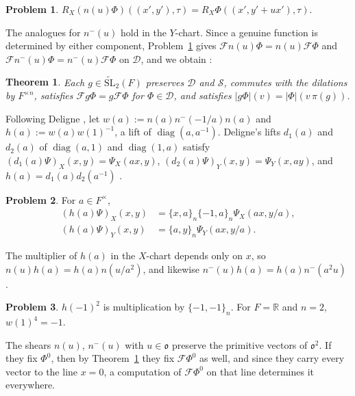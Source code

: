 \documentclass[reqno]{amsart}
\newcommand{\tSL}{\widetilde{\mathrm{SL}}_2}
\newcommand{\Fc}{\mathcal{F}}
\newcommand{\Dc}{\mathcal{D}}
\newcommand{\Sc}{\mathcal{S}}
\newcommand{\oo}{\mathfrak{o}}
\numberwithin{equation}{section}
\theoremstyle{definition}
\newtheorem{problem}{Problem}[section]
\theoremstyle{plain}
\newtheorem{theorem}{Theorem}[section]
\begin{document}
\begin{problem}\label{pr:unip-lines}
  $R_X(n(u) \Phi)((x', y'), \tau) = R_X \Phi((x', y' + u x'), \tau)$.
\end{problem}

The analogues for $n^-(u)$ hold in the $Y$-chart.  Since a genuine function is determined by either component, Problem~\ref{pr:unip-lines} gives $\Fc n(u) \Phi = n(u) \Fc \Phi$ and $\Fc n^-(u) \Phi = n^-(u) \Fc \Phi$ on $\Dc$, and we obtain \cite[Corollary~5.3]{N}:

\begin{theorem}\label{th:metaplectic}
  Each $g \in \tSL(F)$ preserves $\Dc$ and $\Sc$, commutes with the dilations by $F^{\times n}$, satisfies $\Fc g \Phi = g \Fc \Phi$ for $\Phi \in \Dc$, and satisfies $\lvert g \Phi \rvert(v) = \lvert \Phi \rvert(v \, \pi(g))$.
\end{theorem}

Following Deligne \cite[\S1.9]{Del}, let $w(a) := n(a) n^-(-1/a) n(a)$ and $h(a) := w(a) w(1)^{-1}$, a lift of $\operatorname{diag}(a, a^{-1})$.  Deligne's lifts $d_1(a)$ and $d_2(a)$ of $\operatorname{diag}(a, 1)$ and $\operatorname{diag}(1, a)$ satisfy $(d_1(a) \Psi)_X(x, y) = \Psi_X(a x, y)$, $(d_2(a) \Psi)_Y(x, y) = \Psi_Y(x, a y)$, and $h(a) = d_1(a) d_2(a^{-1})$ \cite[\S1.12, (1.14.3), (1.9.3)]{Del}.

\begin{problem}\label{pr:torus-formula}
  For $a \in F^\times$,
  \begin{align*}
    (h(a) \Psi)_X(x, y) &= \{x, a\}_n \{-1, a\}_n \Psi_X(a x, y / a), \\
    (h(a) \Psi)_Y(x, y) &= \{a, y\}_n \Psi_Y(a x, y / a).
  \end{align*}
\end{problem}

The multiplier of $h(a)$ in the $X$-chart depends only on $x$, so $n(u) h(a) = h(a) n(u / a^2)$, and likewise $n^-(u) h(a) = h(a) n^-(a^2 u)$ \cite[Lemma~5.4]{N}.

\begin{problem}\label{pr:torus-center}
  $h(-1)^2$ is multiplication by $\{-1, -1\}_n$.  For $F = \mathbb{R}$ and $n = 2$, $w(1)^4 = -1$.
\end{problem}

The shears $n(u)$, $n^-(u)$ with $u \in \oo$ preserve the primitive vectors of $\oo^2$.  If they fix $\Phi^0$, then by Theorem~\ref{th:metaplectic} they fix $\Fc \Phi^0$ as well, and since they carry every vector to the line $x = 0$, a computation of $\Fc \Phi^0$ on that line determines it everywhere.
\end{document}
